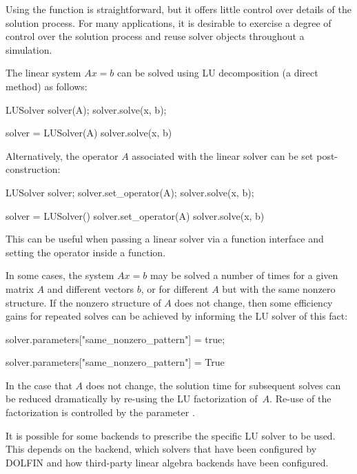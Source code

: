 Using the function  is straightforward, but it offers
little control over details of the solution process. For many
applications, it is desirable to exercise a degree of control over the
solution process and reuse solver objects throughout a simulation.


The linear system $Ax = b$ can be solved using LU decomposition
(a direct method) as follows:
%
\begin{c++}
LUSolver solver(A);
solver.solve(x, b);
\end{c++}
%
\begin{python}
solver = LUSolver(A)
solver.solve(x, b)
\end{python}
%
Alternatively, the operator $A$ associated with the linear solver
can be set post-construction:
%
\begin{c++}
LUSolver solver;
solver.set_operator(A);
solver.solve(x, b);
\end{c++}
%
\begin{python}
solver = LUSolver()
solver.set_operator(A)
solver.solve(x, b)
\end{python}
%
This can be useful when passing a linear solver via a function
interface and setting the operator inside a function.

In some cases, the system $Ax = b$ may be solved a number of times for
a given matrix $A$ and different vectors $b$, or for different $A$ but with the same nonzero structure.
If the nonzero structure of $A$ does not change, then some efficiency
gains for repeated solves can be achieved by informing the LU solver
of this fact:

\begin{c++}
solver.parameters["same_nonzero_pattern"] = true;
\end{c++}

\begin{python}
solver.parameters["same_nonzero_pattern"] = True
\end{python}
In the case that $A$ does not change, the solution time for subsequent
solves can be reduced dramatically by re-using the LU factorization
of~$A$.  Re-use of the factorization is controlled by the parameter
.

It is possible for some backends to prescribe the specific LU solver
to be used. This depends on the backend, which solvers that have been
configured by DOLFIN and how third-party linear algebra backends have
been configured.

